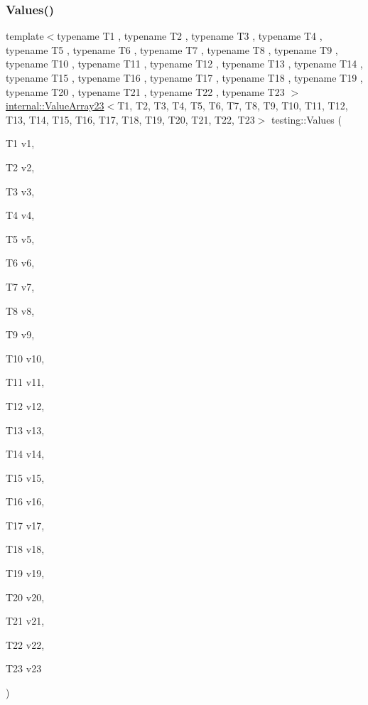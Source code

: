 \subsubsection{\texorpdfstring{Values()}{Values()}\hspace{0.1cm}{\footnotesize\ttfamily [23/50]}}
{\footnotesize\ttfamily template$<$typename T1 , typename T2 , typename T3 , typename T4 , typename T5 , typename T6 , typename T7 , typename T8 , typename T9 , typename T10 , typename T11 , typename T12 , typename T13 , typename T14 , typename T15 , typename T16 , typename T17 , typename T18 , typename T19 , typename T20 , typename T21 , typename T22 , typename T23 $>$ \\
\mbox{\hyperlink{classtesting_1_1internal_1_1ValueArray23}{internal\+::\+Value\+Array23}}$<$T1, T2, T3, T4, T5, T6, T7, T8, T9, T10, T11, T12, T13, T14, T15, T16, T17, T18, T19, T20, T21, T22, T23$>$ testing\+::\+Values (\begin{DoxyParamCaption}\item[{T1}]{v1,  }\item[{T2}]{v2,  }\item[{T3}]{v3,  }\item[{T4}]{v4,  }\item[{T5}]{v5,  }\item[{T6}]{v6,  }\item[{T7}]{v7,  }\item[{T8}]{v8,  }\item[{T9}]{v9,  }\item[{T10}]{v10,  }\item[{T11}]{v11,  }\item[{T12}]{v12,  }\item[{T13}]{v13,  }\item[{T14}]{v14,  }\item[{T15}]{v15,  }\item[{T16}]{v16,  }\item[{T17}]{v17,  }\item[{T18}]{v18,  }\item[{T19}]{v19,  }\item[{T20}]{v20,  }\item[{T21}]{v21,  }\item[{T22}]{v22,  }\item[{T23}]{v23 }\end{DoxyParamCaption})}

\mbox{\label{namespacetesting_a74b2375fe8c3c685e6f7b0b6a9b61009}} 
